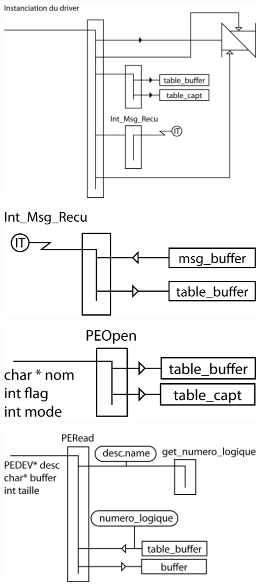 \documentclass[11pt, a4paper]{article}
\begin{document}
\includegraphics{ressources/init.png}\\~\\
\includegraphics{ressources/int.png}\\~\\
\includegraphics{ressources/open.png}\\~\\
\includegraphics{ressources/read.png}\\~\\
\end{document}
